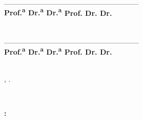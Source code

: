 \documentclass[
	12pt,				%
        openright, %
        twoside,   %
	a4paper,			%
	chapter=TITLE,		%
	english,			%
	french,				%
	spanish,			%
	brazil,				%
    ]{abntex2}
\providecommand{\imprimirsubtitulo}{}
\providecommand{\imprimirmembroB}{}
\providecommand{\imprimirfuncaomembroB}{}
\providecommand{\imprimirfiliacaomembroB}{}
\providecommand{\imprimirmembroEXTRA}{}
\providecommand{\imprimirfuncaomembroEXTRA}{}
\providecommand{\imprimirfiliacaomembroEXTRA}{}
\providecommand{\imprimirdataaprovacao}{}
\begin{document}
\begin{folhadeaprovacao}
\begin{minipage}{15.9cm}
{\vspace{-6.085cm}

\begin{flushright}
\begin{minipage}{0.49\textwidth}
\begin{center}
\_\_\_\_\_\_\_\_\_\_\_\_\_\_\_\_\_\_\_\_\_\_\_\_\_\\
{\small \textbf{
        {
        {\textbf{Prof.\textsuperscript{a} Dr.\textsuperscript{a} \imprimirmembroB}}
        {\textbf{Dr.\textsuperscript{a} \imprimirmembroB}}}
            {
            {\textbf{Prof. Dr. \imprimirmembroB}}
            {\textbf{Dr. \imprimirmembroB}}}}}\\
{\footnotesize \imprimirfuncaomembroB\\\vspace{-1mm}\imprimirfiliacaomembroB}

\vspace{1.9cm}
\_\_\_\_\_\_\_\_\_\_\_\_\_\_\_\_\_\_\_\_\_\_\_\_\_\\
{\small \textbf{
        {
        {\textbf{Prof.\textsuperscript{a} Dr.\textsuperscript{a} \imprimirmembroEXTRA}}
        {\textbf{Dr.\textsuperscript{a} \imprimirmembroEXTRA}}}
            {
            {\textbf{Prof. Dr. \imprimirmembroEXTRA}}
            {\textbf{Dr. \imprimirmembroEXTRA}}}}}\\
{\footnotesize \imprimirfuncaomembroEXTRA\\\vspace{-1mm}\imprimirfiliacaomembroEXTRA}
\end{center}
\end{minipage}
\end{flushright}
\vspace{0.5cm}

\begin{flushright}
\imprimirlocal, \imprimirdataaprovacao.
\end{flushright}
}
{
\begin{center}
\vspace{0.1cm}
\textbf{\imprimirautor}\\
\vspace{0.7cm}

\textbf{\textcolor{verdeCopos}{
        {\bfseries\MakeUppercase{\imprimirtitulo}}
        {\bfseries\MakeUppercase{\imprimirtitulo}: \\ \imprimirsubtitulo}
}}
\end{center}

}
\end{minipage}
\end{folhadeaprovacao}
\end{document}
